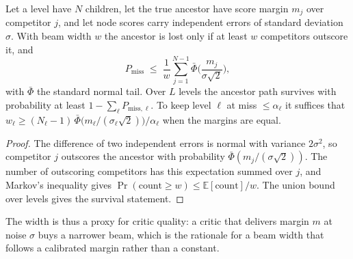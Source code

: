 \begin{proposition}\label{prop:beam}
Let a level have $N$ children, let the true ancestor have score margin $m_j$ over competitor $j$, and let node scores carry independent errors of standard deviation $\sigma$. With beam width $w$ the ancestor is lost only if at least $w$ competitors outscore it, and
\begin{equation}
P_{\text{miss}}\;\le\;\frac1w\sum_{j=1}^{N-1}\bar\Phi\!\Big(\frac{m_j}{\sigma\sqrt2}\Big),
\end{equation}
with $\bar\Phi$ the standard normal tail. Over $L$ levels the ancestor path survives with probability at least $1-\sum_\ell P_{\text{miss},\ell}$. To keep level $\ell$ at miss $\le\alpha_\ell$ it suffices that $w_\ell\ge(N_\ell-1)\,\bar\Phi\big(m_\ell/(\sigma_\ell\sqrt2)\big)/\alpha_\ell$ when the margins are equal.
\end{proposition}
\begin{proof}
The difference of two independent errors is normal with variance $2\sigma^2$, so competitor $j$ outscores the ancestor with probability $\bar\Phi(m_j/(\sigma\sqrt2))$. The number of outscoring competitors has this expectation summed over $j$, and Markov's inequality gives $\Pr(\text{count}\ge w)\le\mathbb E[\text{count}]/w$. The union bound over levels gives the survival statement.\qedhere
\end{proof}
\noindent The width is thus a proxy for critic quality: a critic that delivers margin $m$ at noise $\sigma$ buys a narrower beam, which is the rationale for a beam width that follows a calibrated margin rather than a constant.

